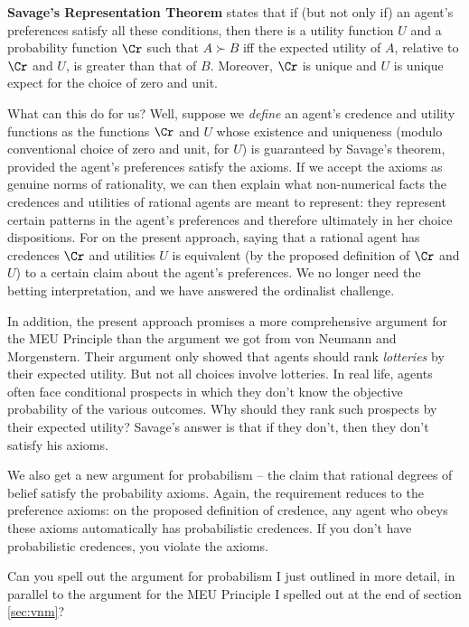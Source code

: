 \textbf{Savage's Representation Theorem} states that if (but not only
if) an agent's preferences satisfy all these conditions, then there is
a utility function $U$ and a probability function $\Cr$ such that $A
\succ B$ iff the expected utility of $A$, relative to $\Cr$ and $U$,
is greater than that of $B$. Moreover, $\Cr$ is unique and $U$ is
unique expect for the choice of zero and unit.

What can this do for us? Well, suppose we \emph{define} an agent's credence
and utility functions as the functions $\Cr$ and $U$ whose existence
and uniqueness (modulo conventional choice of zero and unit, for $U$)
is guaranteed by Savage's theorem, provided the agent's preferences
satisfy the axioms. If we accept the axioms as genuine norms of
rationality, we can then explain what non-numerical facts the
credences and utilities of rational agents are meant to represent:
they represent certain patterns in the agent's preferences and
therefore ultimately in her choice dispositions. For on the present
approach, saying that a rational agent has credences $\Cr$ and
utilities $U$ is equivalent (by the proposed definition of $\Cr$ and
$U$) to a certain claim about the agent's preferences. We no longer
need the betting interpretation, and we have answered the ordinalist challenge.

In addition, the present approach promises a more comprehensive
argument for the MEU Principle than the argument we got from von
Neumann and Morgenstern. Their argument only showed that agents should
rank \emph{lotteries} by their expected utility. But not all choices
involve lotteries. In real life, agents often face conditional
prospects in which they don't know the objective probability of the
various outcomes. Why should they rank such prospects by their
expected utility? Savage's answer is that if they don't, then they
don't satisfy his axioms.

We also get a new argument for probabilism -- the claim that rational
degrees of belief satisfy the probability axioms. Again, the
requirement reduces to the preference axioms: on the proposed
definition of credence, any agent who obeys these axioms automatically
has probabilistic credences. If you don't have probabilistic
credences, you violate the axioms.


\begin{exercise}{2}
  Can you spell out the argument for probabilism I just outlined in
  more detail, in parallel to the argument for the MEU Principle I
  spelled out at the end of section \ref{sec:vnm}?
\end{exercise}


